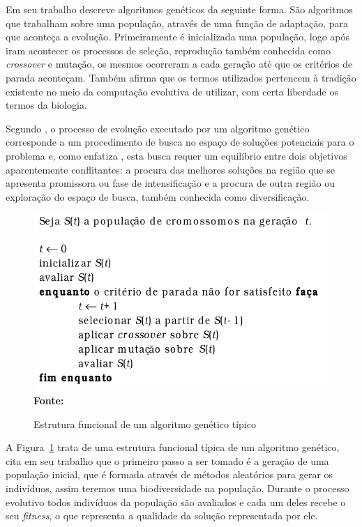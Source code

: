 \documentclass{abntpuc}
\begin{document}
Em seu trabalho \cite{lucas2000algoritmos} descreve algoritmos genéticos da seguinte forma. São algoritmos que trabalham sobre uma população, através de uma função de adaptação, para que aconteça a evolução. Primeiramente é inicializada uma população, logo após iram acontecer os processos de seleção, reprodução também conhecida como \textit{crossover} e mutação, os mesmos ocorreram a cada geração até que os critérios de parada aconteçam. Também afirma que os termos utilizados pertencem à tradição existente no meio da computação evolutiva de utilizar, com certa liberdade os termos da biologia.

Segundo \cite{oliveira2005algoritmo}, o processo de evolução executado por um algoritmo genético corresponde a um procedimento de busca no espaço de soluções potenciais para o problema e, como enfatiza \cite{michalewicz1996evolutionary}, esta busca requer um equilíbrio entre dois objetivos aparentemente conflitantes: a procura das melhores soluções na região que se apresenta promissora ou fase de intensificação e a procura de outra região ou exploração do espaço de busca, também conhecida como diversificação.\par

\begin{figure}[!htb]
\caption[Estrutura funcional de um algoritmo genético típico]{Estrutura funcional de um algoritmo genético típico}
\label{fig:ag}
\centering
\includegraphics[scale=0.5]{imagens/ag.png}
\\ \textbf{\footnotesize Fonte: \cite{de1999introduccao}}
\end{figure}


A Figura~\ref{fig:ag} trata de uma estrutura funcional típica de um algoritmo genético, \cite{de1999introduccao} cita em seu trabalho que o primeiro passo a ser tomado é a geração de uma população inicial, que é formada através de métodos aleatórios para gerar os indivíduos, assim teremos uma biodiversidade na população. Durante o processo evolutivo todos indivíduos da população são avaliados e cada um deles recebe o seu \textit{fitness}, o que representa a qualidade da solução representada por ele.\par
\end{document}

